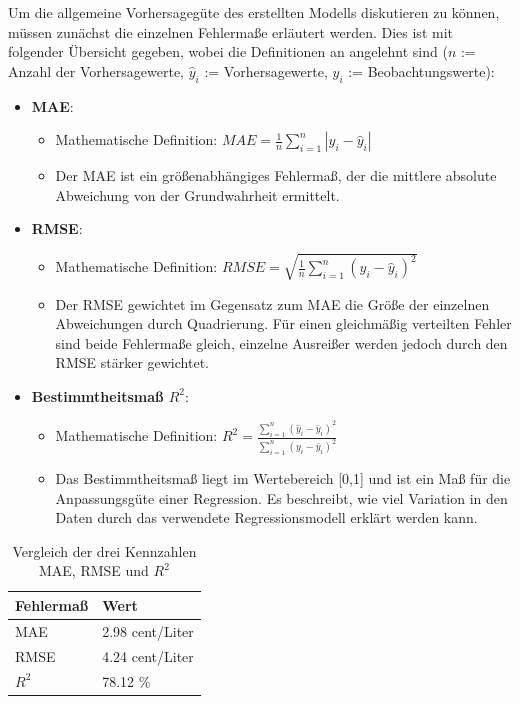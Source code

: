 \documentclass[
ngerman          %
,a4paper          %
,11pt
,pdftex
]{report}
\begin{document}
Um die allgemeine Vorhersagegüte des erstellten Modells diskutieren zu können, müssen zunächst die einzelnen Fehlermaße erläutert werden. Dies ist mit folgender Übersicht gegeben, wobei die Definitionen an \cite{maermse} angelehnt sind ($n$ := Anzahl der Vorhersagewerte, $\hat{y}_i$ := Vorhersagewerte, $y_i$ := Beobachtungswerte):

\newpage
\begin{itemize}
	\item \textbf{\acf{MAE}}: 
	\begin{itemize}
		\item Mathematische Definition: $MAE = \frac{1}{n} \sum_{i=1}^{n}|y_i - \hat{y}_i|$
		\item Der \ac{MAE} ist ein größenabhängiges Fehlermaß, der die mittlere absolute Abweichung von der Grundwahrheit ermittelt. 
	\end{itemize}
	\item \textbf{\acf{RMSE}}:
	\begin{itemize}
		\item Mathematische Definition: $RMSE = \sqrt{\frac{1}{n} \sum_{i=1}^{n}(y_i - \hat{y}_i)^2} $
		\item Der \ac{RMSE} gewichtet im Gegensatz zum \ac{MAE} die Größe der einzelnen Abweichungen durch Quadrierung. Für einen gleichmäßig verteilten Fehler sind beide Fehlermaße gleich, einzelne Ausreißer werden jedoch durch den \ac{RMSE} stärker gewichtet.
	\end{itemize}
	\item \textbf{Bestimmtheitsmaß $R^2$}:
	\begin{itemize}
		\item Mathematische Definition: $ R^2 = \frac{\sum_{i=1}^{n} (\hat{y}_i - \bar{y}_i)^2}{\sum_{i=1}^{n} (y_i - \bar{y}_i)^2}$
		\item Das Bestimmtheitsmaß liegt im Wertebereich [0,1] und ist ein Maß für die Anpassungsgüte einer Regression. Es beschreibt, wie viel Variation in den Daten durch das verwendete Regressionsmodell erklärt werden kann. 
	\end{itemize}
\end{itemize}

\begin{table}
	\centering
	\begin{tabular}{l l}
		\textbf{Fehlermaß} & \textbf{Wert} \\ 
		\hline 
		\hline
		\ac{MAE} & 2.98 cent/Liter \\ 
		\ac{RMSE} & 4.24 cent/Liter \\ 
		$R^2$ & 78.12 \% \\ 
		\hline
	\end{tabular} 
	\caption{Vergleich der drei Kennzahlen MAE, RMSE und $R^2$}
	\label{tab:eval}
\end{table}
\end{document}
